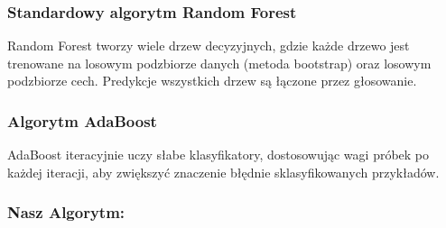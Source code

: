 \documentclass[11pt,a4paper]{article}
\begin{document}
\subsubsection{Standardowy algorytm Random Forest}
Random Forest tworzy wiele drzew decyzyjnych, gdzie każde drzewo jest trenowane na losowym podzbiorze danych (metoda bootstrap) oraz losowym podzbiorze cech. Predykcje wszystkich drzew są łączone przez głosowanie.

\subsubsection{Algorytm AdaBoost}
AdaBoost iteracyjnie uczy słabe klasyfikatory, dostosowując wagi próbek po każdej iteracji, aby zwiększyć znaczenie błędnie sklasyfikowanych przykładów.


\subsubsection{Nasz Algorytm:}
\end{document}

